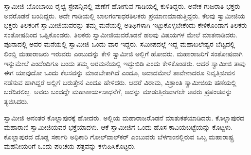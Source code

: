 ಸ್ವಾಮೀಜಿ ಬೊಂಬಾಯಿ ರೈಲ್ವೆ ಸ್ಟೇಷನ್ನಿನಲ್ಲಿ ಪುಣೆಗೆ ಹೋಗುವ ಗಾಡಿಯಲ್ಲಿ ಕುಳಿತಿದ್ದರು. ಅನೇಕ ಗುಜರಾತಿ ಭಕ್ತರು ಅವರೊಡನೆ ಬಂದಿದ್ದರು. ಅದೇ ಗಾಡಿಯಲ್ಲಿ ಬಾಲಗಂಗಾಧರತಿಲಕರು ಪ್ರಯಾಣಮಾಡುತ್ತಿದ್ದರು. ಕೆಲವು ಸ್ವಾಮೀಜಿಯ ಭಕ್ತರು ತಿಲಕರಿಗೆ ಸ್ವಾಮೀಜಿಯವರನ್ನು ತಮ್ಮ ಮನೆಯಲ್ಲಿ ಅತಿಥಿಗಳಾಗಿ ಇಟ್ಟುಕೊಳ್ಳಬೇಕೆಂದು ಕೇಳಿಕೊಂಡಾಗ ತಿಲಕರು ಸಂತೋಷದಿಂದ ಒಪ್ಪಿಕೊಂಡರು. ತಿಲಕರು ಸ್ವಾಮೀಜಿಯವರೊಡನೆ ಹಲವು ವಿಷಯಗಳ ಮೇಲೆ ಮಾತನಾಡಿದರು. ಪೂನಾದಲ್ಲಿ ಅವರ ಮನೆಯಲ್ಲಿ ಸ್ವಾಮೀಜಿ ಒಂದು ವಾರ ಇದ್ದರು. ಸಮೀಪದಲ್ಲೆ ಇದ್ದ ಮಹಾಬಲೇಶ್ವರ ಬೆಟ್ಟದಲ್ಲಿ ಲಿಂಬ್ಡಿ ಮಹಾರಾಜರು ಇರುವರು ಎಂಬುದನ್ನು ಕೇಳಿ ಸ್ವಾಮೀಜಿ ಅಲ್ಲಿಗೆ ಹೋದರು. ಮಹಾರಾಜರಿಗೆ ಸಂತೋಷವಾಗಿ ಇನ್ನುಮೇಲೆ ಎಂದೆಂದಿಗೂ ಬಂದು ತಮ್ಮ ಅರಮನೆಯಲ್ಲಿ ಇದ್ದುಬಿಡಿ ಎಂದು ಕೇಳಿಕೊಂಡರು. ಆದರೆ ಸ್ವಾಮೀಜಿ ತಾವು ಈಗ ಯಾವುದೋ ಒಂದು ಕೆಲಸವನ್ನು ಮಾಡಬೇಕಾಗಿದೆ ಎಂದೂ, ಅದಾದಮೇಲೆ ತಾವೇನಾದರೂ ನಿವೃತ್ತಿಜೀವನ ನಡೆಸುವ ಹಾಗಿದ್ದರೆ ಅಲ್ಲಿಗೆ ಬರುತ್ತೇನೆ ಎಂದೂ ಹೇಳಿದರು. ಆದರೆ ವಿರಾಮ, ವಿಶ್ರಾಂತಿ ಸ್ವಾಮೀಜಿಯ ಹಣೆಯಲ್ಲಿ ಬರೆದಿರಲಿಲ್ಲ. ಅವರು ಬಂದದ್ದೇ ಮಹಾಕಾರ್ಯಸಾಧನೆಗೆ, ಅದನ್ನು ಮಾಡುತ್ತಿರುವಾಗಲೇ ಅವರು ಪ್ರಪಂಚವನ್ನು ತ್ಯಜಿಸಿದರು. 

 ಸ್ವಾಮೀಜಿ ಅನಂತರ ಕೊಲ್ಲಾಪುರಕ್ಕೆ ಹೋದರು. ಅಲ್ಲಿಯ ಮಹಾರಾಜರೊಡನೆ ಮಾತುಕತೆಯಾಡಿದರು. ಕೊಲ್ಲಾಪುರದ ಮಹಾರಾಣಿ ಸ್ವಾಮೀಜಿಯವರ ಭಕ್ತೆಯಾದಳು. ಆಕೆ ಸ್ವಾಮೀಜಿಗೆ ಒಂದು ಹೊಸ ಕಾವಿಯಬಟ್ಟೆಯನ್ನು ಕೊಟ್ಟಳು. ಕೊಲ್ಲಾಪುರದ ದೊಡ್ಡ ಸರ್ಕಾರಿ ಅಧಿಕಾರಿ ಗೋಲ್‍ವಾಲ್‍ಕರ್ ಎಂಬುವರು ಬೆಳಗಾಂನಲ್ಲಿರುವ ಒಬ್ಬ ಮಹಾರಾಷ್ಟ್ರ ಮಹನೀಯರಿಗೆ ಒಂದು ಪರಿಚಯ ಪತ್ರವನ್ನು ಕಳುಹಿಸಿಕೊಟ್ಟರು. 

